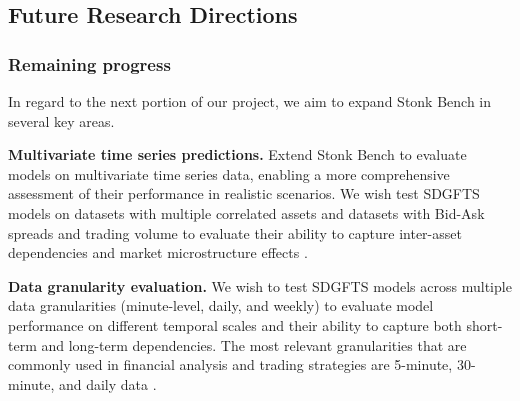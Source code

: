 \documentclass[sigconf]{acmart}
\begin{document}
  \subsection{Future Research Directions}
    \subsubsection{Remaining progress} In regard to the next portion
    of our project, we aim to expand Stonk Bench in several key areas.
    \begin{enumerate}[label=\textbf{[F\arabic*]}]
      \item \textbf{Multivariate time series predictions.}
        Extend Stonk Bench to evaluate models on multivariate time
        series data, enabling a more comprehensive assessment of their
        performance in realistic scenarios. We wish test SDGFTS models
        on datasets with multiple correlated assets and datasets with
        Bid-Ask spreads and trading volume to evaluate their ability to
        capture inter-asset dependencies and market microstructure
        effects \cite{Takahashi24}.
        \item \textbf{Data granularity evaluation.}
        We wish to test SDGFTS models across multiple data granularities
        (minute-level, daily, and weekly) to evaluate model performance
        on different temporal scales and their ability to capture both
        short-term and long-term dependencies. The most relevant granularities
        that are commonly used in financial analysis and trading strategies
        are 5-minute, 30-minute, and daily data \cite{Wang20, Cont01}.
    \end{enumerate}
\end{document}
